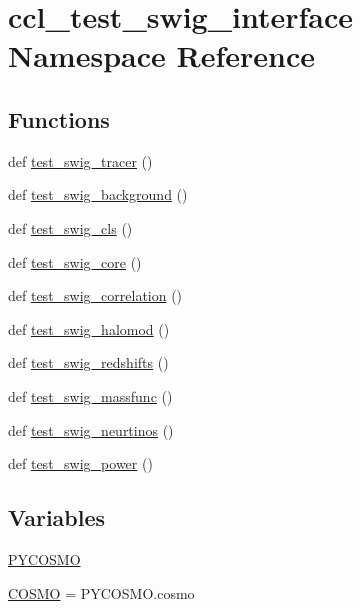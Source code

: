 \hypertarget{namespaceccl__test__swig__interface}{}\section{ccl\+\_\+test\+\_\+swig\+\_\+interface Namespace Reference}
\label{namespaceccl__test__swig__interface}
\subsection*{Functions}
\begin{DoxyCompactItemize}
\item 
def \mbox{\hyperlink{namespaceccl__test__swig__interface_a2aa841b1cc680b2bf85b712c9c1ad9aa}{test\+\_\+swig\+\_\+tracer}} ()
\item 
def \mbox{\hyperlink{namespaceccl__test__swig__interface_a0b9a0e9ddaaa7a37c01c289f200d9d63}{test\+\_\+swig\+\_\+background}} ()
\item 
def \mbox{\hyperlink{namespaceccl__test__swig__interface_ac0a01891ea854bac607860713979d767}{test\+\_\+swig\+\_\+cls}} ()
\item 
def \mbox{\hyperlink{namespaceccl__test__swig__interface_a896334ea462ebbdeb776f6e4bb92f581}{test\+\_\+swig\+\_\+core}} ()
\item 
def \mbox{\hyperlink{namespaceccl__test__swig__interface_a14c0226455a9c104e18098977d03bf6a}{test\+\_\+swig\+\_\+correlation}} ()
\item 
def \mbox{\hyperlink{namespaceccl__test__swig__interface_a8e2642dc39a7ea80575828fd9163cd11}{test\+\_\+swig\+\_\+halomod}} ()
\item 
def \mbox{\hyperlink{namespaceccl__test__swig__interface_a04f3ecfe853d8ca95487f9b19100807c}{test\+\_\+swig\+\_\+redshifts}} ()
\item 
def \mbox{\hyperlink{namespaceccl__test__swig__interface_a1211737259a7986dadf7e2ecb9d7c7e2}{test\+\_\+swig\+\_\+massfunc}} ()
\item 
def \mbox{\hyperlink{namespaceccl__test__swig__interface_a2c48b417c0fcc2e6db75bbfd02516841}{test\+\_\+swig\+\_\+neurtinos}} ()
\item 
def \mbox{\hyperlink{namespaceccl__test__swig__interface_a1bcdfd3c1b4ea96915fbdc8dc2960dec}{test\+\_\+swig\+\_\+power}} ()
\end{DoxyCompactItemize}
\subsection*{Variables}
\begin{DoxyCompactItemize}
\item 
\mbox{\hyperlink{namespaceccl__test__swig__interface_abc24f5e95297d21e2f05fc865e056c99}{P\+Y\+C\+O\+S\+MO}}
\item 
\mbox{\hyperlink{namespaceccl__test__swig__interface_aa47ecf47fee76d3eba81a5d1a455beb0}{C\+O\+S\+MO}} = P\+Y\+C\+O\+S\+M\+O.\+cosmo
\end{DoxyCompactItemize}


